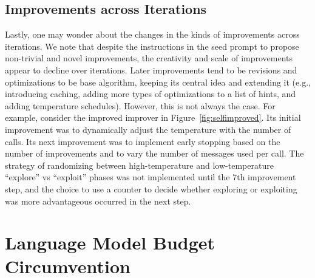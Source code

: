 \documentclass{article}
\begin{document}
\clearpage
\newpage

\subsection{Improvements across Iterations}
Lastly, one may wonder about the changes in the kinds of improvements across iterations. We note that despite the instructions in the seed prompt to propose non-trivial and novel improvements, the creativity and scale of improvements appear to decline over iterations. Later improvements tend to be revisions and optimizations to be base algorithm, keeping its central idea and extending it (e.g., introducing caching, adding more types of optimizations to a list of hints, and adding temperature schedules). However, this is not always the case. For example, consider the improved improver in Figure~\ref{fig:selfimproved}. Its initial improvement was to dynamically adjust the temperature with the number of calls. Its next improvement was to implement early stopping based on the number of improvements and to vary the number of messages used per call. The strategy of randomizing between high-temperature and low-temperature ``explore'' vs ``exploit'' phases was not implemented until the 7th improvement step, and the choice to use a counter to decide whether exploring or exploiting was more advantageous occurred in the next step.

\clearpage
\newpage


\section{Language Model Budget Circumvention}
\end{document}
